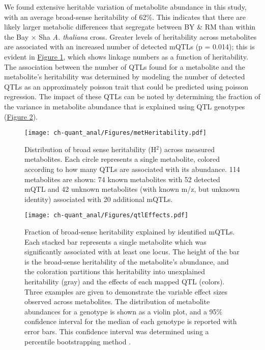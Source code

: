 We found extensive heritable variation of metabolite abundance in this study, with an average broad-sense heritability of 62\%.  This indicates that there are likely larger metabolic differences that segregate between BY \& RM than within the Bay $\times$ Sha \textit{A. thaliana} cross. Greater levels of heritability across metabolites are associated with an increased number of detected mQTLs (p = 0.014); this is evident in \hyperref[ch-quant_anal:metHeritability]{Figure \ref{ch-quant_anal:metHeritability}}, which shows linkage numbers as a function of heritability. The association between the number of QTLs found for a metabolite and the metabolite's heritability was determined by modeling the number of detected QTLs as an approximately poisson trait that could be predicted using poisson regression. The impact of these QTLs can be noted by determining the fraction of the variance in metabolite abundance that is explained using QTL genotypes (\hyperref[ch-quant_anal:qtlEffects]{Figure \ref{ch-quant_anal:qtlEffects}}).

\begin{figure}[h!]
\begin{center}
\texttt{[image: ch-quant\_anal/Figures/metHeritability.pdf]}
\caption[Distribution of broad sense heritability (H$^{2}$) across measured metabolites]{Distribution of broad sense heritability (H$^{2}$) across measured metabolites. Each circle represents a single metabolite, colored according to how many QTLs are associated with its abundance.  114 metabolites are shown: 74 known metabolites with 52 detected mQTL and 42 unknown metabolites (with known m/z, but unknown identity) associated with 20 additional mQTLs.}
\label{ch-quant_anal:metHeritability}
\end{center}
\end{figure}

\begin{figure}[h!]
\begin{center}
\texttt{[image: ch-quant\_anal/Figures/qtlEffects.pdf]}
\caption[Fraction of broad-sense heritability explained by identified mQTLs]{Fraction of broad-sense heritability explained by identified mQTLs.  Each stacked bar represents a single metabolite which was significantly associated with at least one locus.  The height of the bar is the broad-sense heritability of the metabolite's abundance, and the coloration partitions this heritability into unexplained heritability (gray) and the effects of each mapped QTL (colors).  Three examples are given to demonstrate the variable effect sizes observed across metabolites.  The distribution of metabolite abundances for a genotype is shown as a violin plot, and a 95\% confidence interval for the median of each genotype is reported with error bars.  This confidence interval was determined using a percentile bootstrapping method \cite{Davison:1997vn}.}
\label{ch-quant_anal:qtlEffects}
\end{center}
\end{figure}

